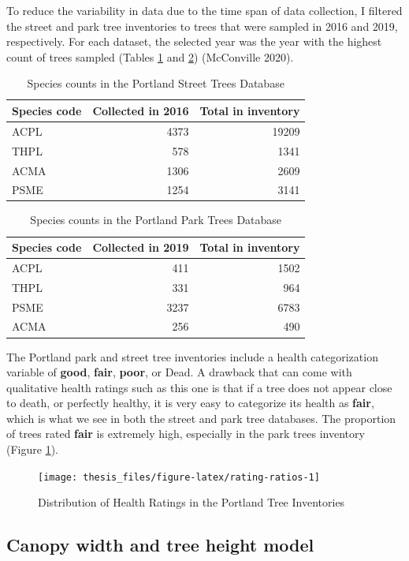 \documentclass[12pt,twoside]{reedthesis}
\begin{document}
To reduce the variability in data due to the time span of data
collection, I filtered the street and park tree inventories to trees
that were sampled in 2016 and 2019, respectively. For each dataset, the
selected year was the year with the highest count of trees sampled
(Tables \ref{tab:streettable} and \ref{tab:parktable}) (McConville 2020).
\begin{table}

\caption[Species counts in Street Trees Database]{\label{tab:streettable}Species counts in the Portland Street Trees Database}
\centering
\begin{tabular}[t]{lrr}
\toprule
Species code & Collected in 2016 & Total in inventory\\
\midrule
ACPL & 4373 & 19209\\
THPL & 578 & 1341\\
ACMA & 1306 & 2609\\
PSME & 1254 & 3141\\
\bottomrule
\end{tabular}
\end{table}
\begin{table}

\caption[Species counts in Park Trees Database]{\label{tab:parktable}Species counts in the Portland Park Trees Database}
\centering
\begin{tabular}[t]{lrr}
\toprule
Species code & Collected in 2019 & Total in inventory\\
\midrule
ACPL & 411 & 1502\\
THPL & 331 & 964\\
PSME & 3237 & 6783\\
ACMA & 256 & 490\\
\bottomrule
\end{tabular}
\end{table}
The Portland park and street tree inventories include a health
categorization variable of \textbf{good}, \textbf{fair}, \textbf{poor}, or Dead. A
drawback that can come with qualitative health ratings such as this one
is that if a tree does not appear close to death, or perfectly healthy,
it is very easy to categorize its health as \textbf{fair}, which is what we
see in both the street and park tree databases. The proportion of trees
rated \textbf{fair} is extremely high, especially in the park trees inventory
(Figure \ref{fig:rating-ratios}).
\begin{figure}

{\centering \texttt{[image: thesis\_files/figure-latex/rating-ratios-1]} 

}

\caption{Distribution of Health Ratings in the Portland Tree Inventories}\label{fig:rating-ratios}
\end{figure}
\hypertarget{canopy-width-and-tree-height-model}{%
\subsection{Canopy width and tree height model}\label{canopy-width-and-tree-height-model}}
\end{document}

